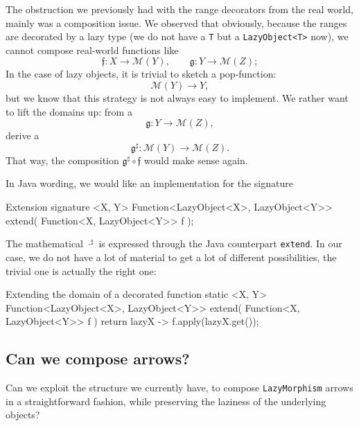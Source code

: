 \documentclass[12pt,a4paper]{report}
\renewcommand{\baselinestretch}{1.5}
\theoremstyle{theorem}
\theoremstyle{definition}
\begin{document}
The obstruction we previously had with
the range decorators from the real world, mainly was a composition issue.
We observed that obviously, because the ranges
are decorated by a lazy type (we do not have a \lstinline{T}{}
but a \lstinline{LazyObject<T>}{} now), we cannot compose
real-world functions like
	\[ \mathfrak{f} : X\to \mathcal{M}(Y),
		\qquad \mathfrak{g} : Y\to \mathcal{M}(Z) ;\]
In the case of lazy objects, it is trivial to sketch a pop-function:
	\[ \mathcal{M}(Y) \to Y , \]
but we know that this strategy is not always easy to implement.
We rather want to lift the domains up: from a
	\[ \mathfrak{g} : Y\to \mathcal{M}(Z) ,\]
derive a
	\[ \mathfrak{g}^\sharp : \mathcal{M}(Y)\to \mathcal{M}(Z) .\]
That way, the composition $\mathfrak{g}^\sharp\circ \mathfrak{f}$
would make sense again.

In Java wording, we would like an implementation for the signature

\renewcommand{\baselinestretch}{1} 
\selectfont

\begin{javacode}{Extension signature}
<X, Y> Function<LazyObject<X>, LazyObject<Y>> extend(
  Function<X, LazyObject<Y>> f
);
\end{javacode}

\renewcommand{\baselinestretch}{1.5} 
\selectfont

The mathematical ${\cdot}^\sharp$ is expressed through the Java counterpart
\lstinline{extend}{}.
In our case, we do not have a lot of material to get a lot of different
possibilities, the trivial one is actually the right one:

\renewcommand{\baselinestretch}{1} 
\selectfont

\begin{javacode}{Extending the domain of a decorated function}
static <X, Y> Function<LazyObject<X>, LazyObject<Y>> extend(
  Function<X, LazyObject<Y>> f
)
  { return lazyX -> f.apply(lazyX.get()); }
\end{javacode}

\renewcommand{\baselinestretch}{1.5} 
\selectfont

\subsection{Can we compose arrows?}

Can we exploit the structure we currently have, to compose
\lstinline{LazyMorphism}{} arrows in a straightforward fashion,
while preserving the laziness of the underlying objects?
\end{document}
